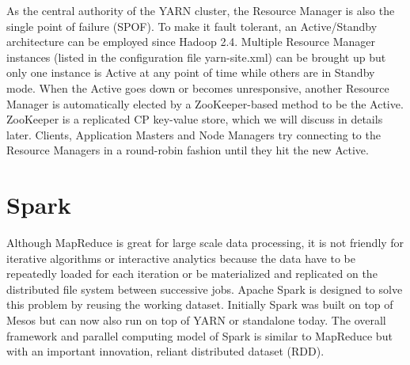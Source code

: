 \documentclass[12pt]{book}
\begin{document}
As the central authority of the YARN cluster, the Resource Manager is also the single point of failure (SPOF). To make it fault tolerant, an Active/Standby architecture can be employed since Hadoop 2.4. Multiple Resource Manager instances (listed in the configuration file yarn-site.xml) can be brought up but only one instance is Active at any point of time while others are in Standby mode. 
When the Active goes down or becomes unresponsive, another Resource Manager is automatically elected by a ZooKeeper-based method to be the Active. ZooKeeper is a replicated CP key-value store, which we will discuss in details later. Clients, Application Masters and Node Managers try connecting to the Resource Managers in a round-robin fashion until they hit the new Active. 

\chapter[Spark]
{Spark}
 Although MapReduce is great for large scale data processing, it is not friendly for iterative algorithms or interactive analytics because the data have to be repeatedly loaded for each iteration or be materialized and replicated on the distributed file system between successive jobs. Apache Spark \cite{Zaharia:2010:SCC, Zaharia:2012:RDD, Spark} is designed to solve this problem by reusing the working dataset. Initially Spark was built on top of Mesos but can now also run on top of YARN or standalone today. The overall framework and parallel computing model of Spark is similar to MapReduce but with an important innovation, reliant distributed dataset (RDD).
\end{document}
